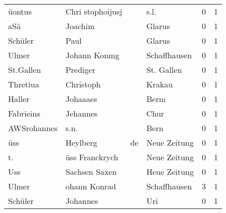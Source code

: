 \begin{center}
\begin{tiny}
\begin{longtabu}{llllrr}
                   üontus &                   Chri stophoijusj &             &                                        s.l. &          0 &         1 \\
                      aSä &                            Joachim &             &                                      Glarus &          0 &         1 \\
                  Schüler &                               Paul &             &                                      Glarus &          0 &         1 \\
                    Ulmer &                       Johann Konmg &             &                                Schaffhausen &          0 &         1 \\
                St.Gallen &                           Prediger &             &                                  St. Gallen &          0 &         1 \\
                 Thretiua &                          Christoph &             &                                      Krakau &          0 &         1 \\
                   Haller &                           Johaaaes &             &                                        Berm &          0 &         1 \\
                Fabrieins &                           Jehannes &             &                                        Chur &          0 &         1 \\
              AWSrohannes &                               s.n. &             &                                        Bern &          0 &         1 \\
                      üss &                           Heylberg &          de &                                Neue Zeitung &          0 &         1 \\
                       t. &                     üss Franckrych &             &                                Neue Zeitung &          0 &         1 \\
                      Uss &                      Sachsen Saxen &             &                                Heue Zeitung &          0 &         1 \\
                    Ulmer &                       ohann Konrad &             &                                Schaffhausen &          3 &         1 \\
                  Schüler &                           Johannes &             &                                         Uri &          0 &         1 \\

\end{longtabu}
\end{tiny}
\end{center}
